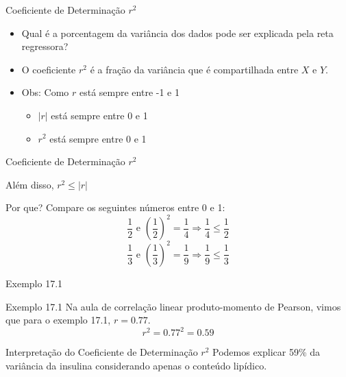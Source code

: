 \documentclass{beamer}
\begin{document}
\begin{frame}{\scriptsize Coeficiente de Determinação $r^2$}
  \begin{block}{}
    \footnotesize
    \begin{itemize}
      \small
    \item Qual é a porcentagem da variância dos dados pode ser explicada
      pela reta regressora?
      \medskip
    \item O coeficiente $r^2$ é a fração da variância que é
      compartilhada entre $X$ e $Y$.
    \end{itemize}
  \end{block}
    \vfill
    \begin{itemize}
      \small
    \item Obs: Como $r$ está sempre entre -1 e 1
    \begin{itemize}
      \scriptsize
    \item $|r|$ está sempre entre 0 e 1
      \medskip
    \item $r^2$ está sempre entre 0 e 1
    \end{itemize}
  \end{itemize}
\end{frame}

\begin{frame}{\scriptsize Coeficiente de Determinação $r^2$}
  \begin{block}{}
    \footnotesize
    \centering
    Além disso, $r^2 \le |r|$
  \end{block}
  \bigskip
  \begin{exampleblock}{Por que?}
    \small
    Compare os seguintes números entre 0 e 1:
    \bigskip
    \scriptsize
    \begin{displaymath}
      \frac{1}{2} \text{ e } \left(\frac{1}{2}\right)^2=\frac{1}{4} \Rightarrow
      \frac{1}{4} \le \frac{1}{2}
    \end{displaymath}
    \begin{displaymath}
      \frac{1}{3} \text{ e } \left(\frac{1}{3}\right)^2=\frac{1}{9} \Rightarrow
      \frac{1}{9} \le \frac{1}{3}
    \end{displaymath}
  \end{exampleblock}
\end{frame}

\begin{frame}{\scriptsize Exemplo 17.1}
  \begin{exampleblock}{Exemplo 17.1}
    \small
    Na aula de correlação linear produto-momento de Pearson, vimos que para o exemplo 17.1, $r=0.77$.
    \begin{displaymath}
      r^2 = 0.77^2 = 0.59
    \end{displaymath}
  \end{exampleblock}
        \bigskip
  \begin{exampleblock}{\small Interpretação do Coeficiente de Determinação $r^2$}
    Podemos explicar 59\% da variância da insulina considerando apenas o conteúdo lipídico.
  \end{exampleblock}
\end{frame}
\end{document}
